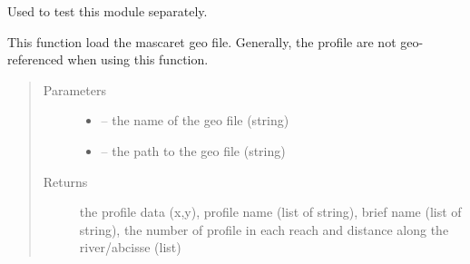 \documentclass[letterpaper,10pt,english]{sphinxmanual}
\begin{document}

\begin{fulllineitems}
\label{\detokenize{index:src.mascaret.main}}
Used to test this module separately.

\end{fulllineitems}


\begin{fulllineitems}
\label{\detokenize{index:src.mascaret.open_geo_mascaret}}
This function load the mascaret geo file. Generally, the profile are not geo-referenced when using this function.
\begin{quote}\begin{description}
\item[{Parameters}] \leavevmode\begin{itemize}
\item {} 
 -- the name of the geo file (string)

\item {} 
 -- the path to the geo file (string)

\end{itemize}

\item[{Returns}] \leavevmode
the profile data (x,y), profile name (list of string),
brief name (list of string), the number of profile in each reach and distance along the river/abcisse (list)

\end{description}\end{quote}

\end{fulllineitems}

\end{document}
